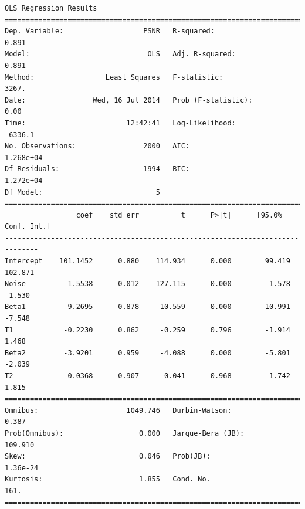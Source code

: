 \documentclass[11pt]{article}
\theoremstyle{definition}
\begin{document}
{\begin{lstlisting}[caption = Time Series 2 - Non-Local Means Filter 2 Iterations OLS Model, label = {multinlmeans2}]
                            OLS Regression Results                            
==============================================================================
Dep. Variable:                   PSNR   R-squared:                       0.891
Model:                            OLS   Adj. R-squared:                  0.891
Method:                 Least Squares   F-statistic:                     3267.
Date:                Wed, 16 Jul 2014   Prob (F-statistic):               0.00
Time:                        12:42:41   Log-Likelihood:                -6336.1
No. Observations:                2000   AIC:                         1.268e+04
Df Residuals:                    1994   BIC:                         1.272e+04
Df Model:                           5                                         
==============================================================================
                 coef    std err          t      P>|t|      [95.0% Conf. Int.]
------------------------------------------------------------------------------
Intercept    101.1452      0.880    114.934      0.000        99.419   102.871
Noise         -1.5538      0.012   -127.115      0.000        -1.578    -1.530
Beta1         -9.2695      0.878    -10.559      0.000       -10.991    -7.548
T1            -0.2230      0.862     -0.259      0.796        -1.914     1.468
Beta2         -3.9201      0.959     -4.088      0.000        -5.801    -2.039
T2             0.0368      0.907      0.041      0.968        -1.742     1.815
==============================================================================
Omnibus:                     1049.746   Durbin-Watson:                   0.387
Prob(Omnibus):                  0.000   Jarque-Bera (JB):              109.910
Skew:                           0.046   Prob(JB):                     1.36e-24
Kurtosis:                       1.855   Cond. No.                         161.
==============================================================================
\end{lstlisting}

}
\end{document}
